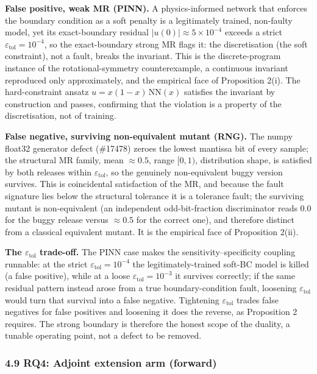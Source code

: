 \documentclass[review,12pt,authoryear]{elsarticle}
\begin{document}
\textbf{False positive, weak MR (PINN).} A physics-informed network
that enforces the boundary condition as a soft penalty is a legitimately
trained, non-faulty model, yet its exact-boundary residual
$|u(0)| \approx 5\times10^{-4}$ exceeds a strict
$\varepsilon_{\mathrm{tol}} = 10^{-4}$, so the exact-boundary strong MR
flags it: the discretisation (the soft constraint), not a fault, breaks
the invariant. This is the discrete-program instance of the
rotational-symmetry counterexample, a continuous invariant reproduced
only approximately, and the empirical face of Proposition 2(i). The
hard-constraint ansatz $u = x(1-x)\,\mathrm{NN}(x)$ satisfies the invariant
by construction and passes, confirming that the violation is a property of
the discretisation, not of training.

\textbf{False negative, surviving non-equivalent mutant (RNG).} The
numpy float32 generator defect (\#17478) zeroes the lowest mantissa bit of
every sample; the structural MR family, mean $\approx 0.5$, range
$[0,1)$, distribution shape, is satisfied by both releases within
$\varepsilon_{\mathrm{tol}}$, so the genuinely non-equivalent buggy version
survives. This is coincidental satisfaction of the MR, and because the
fault signature lies below the structural tolerance it is a tolerance
fault; the surviving mutant is non-equivalent (an independent
odd-bit-fraction discriminator reads $0.0$ for the buggy release versus
$\approx 0.5$ for the correct one), and therefore distinct from a
classical equivalent mutant. It is the empirical face of Proposition
2(ii).

\textbf{The $\varepsilon_{\mathrm{tol}}$ trade-off.} The PINN case makes
the sensitivity--specificity coupling runnable: at the strict
$\varepsilon_{\mathrm{tol}} = 10^{-4}$ the legitimately-trained soft-BC
model is killed (a false positive), while at a loose
$\varepsilon_{\mathrm{tol}} = 10^{-3}$ it survives correctly; if the same
residual pattern instead arose from a true boundary-condition fault,
loosening $\varepsilon_{\mathrm{tol}}$ would turn that survival into a
false negative. Tightening
$\varepsilon_{\mathrm{tol}}$ trades false negatives for false positives and
loosening it does the reverse, as Proposition 2 requires. The strong
boundary is therefore the honest scope of the duality, a tunable
operating point, not a defect to be removed.

\subsubsection{4.9 RQ4: Adjoint extension arm (forward)}\label{rq4-adjoint-extension-arm}
\end{document}
